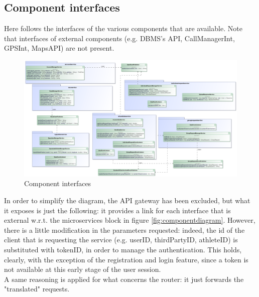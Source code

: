 \subsection{Component interfaces}
Here follows the interfaces of the various components that are available. 
Note that interfaces of external components (e.g. DBMS's API, CallManagerInt, GPSInt, MapsAPI) are not present. 

\begin{figure}[H]
\includegraphics[width=\linewidth]{Images/componentinterfaces.pdf}
\caption{ Component interfaces }
\label{fig:componentinterface}
\end{figure}

In order to simplify the diagram, the API gateway has been excluded, but what it exposes is just the following: it provides a link for each
interface that is external w.r.t. the microservices block in figure \ref{fig:componentdiagram}. However, there is a little modification in the
parameters requested: indeed, the id of the client that is requesting the service (e.g. userID, thirdPartyID, athleteID) is substituted with
tokenID, in order to manage the authentication. This holds, clearly, with the exception of the registration and login feature, since a token 
is not available at this early stage of the user session. \\ 
A same reasoning is applied for what concerns the router: it just forwards the "translated" requests.